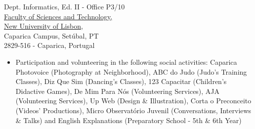 \documentclass[10pt,a4paper,academicons]{altacv}
\begin{document}
\divider

{Dept. Informatics, Ed. II - Office P3/10\\\href{https://www.fct.unl.pt/}{Faculty of Sciences and Technology,\\New University of Lisbon},\\Caparica Campus, Setúbal, PT\\2829-516 - Caparica, Portugal}

\clearpage


\begin{itemize}
\item Participation and volunteering in the following social activities: Caparica Photovoice (Photography at Neighborhood), ABC do Judo (Judo's Training Classes), Diz Que Sim (Dancing's Classes), 123 Capacitar (Children's Didactive Games), De Mim Para Nós (Volunteering Services), AJA (Volunteering Services), Up Web (Design \& Illustration), Corta o Preconceito (Videos' Productions), Micro Observatório Juvenil (Conversations, Interviews \& Talks) and English Explanations (Preparatory School - 5th \& 6th Year)
\end{itemize}

\divider
\end{document}
